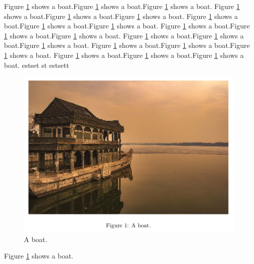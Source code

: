 \documentclass{article}
\begin{document}
Figure \ref{fig:boat1} shows a boat.Figure \ref{fig:boat1} shows a boat.Figure \ref{fig:boat1} shows a boat.
Figure \ref{fig:boat1} shows a boat.Figure \ref{fig:boat1} shows a boat.Figure \ref{fig:boat1} shows a boat.
Figure \ref{fig:boat1} shows a boat.Figure \ref{fig:boat1} shows a boat.Figure \ref{fig:boat1} shows a boat.
Figure \ref{fig:boat1} shows a boat.Figure \ref{fig:boat1} shows a boat.Figure \ref{fig:boat1} shows a boat.
Figure \ref{fig:boat1} shows a boat.Figure \ref{fig:boat1} shows a boat.Figure \ref{fig:boat1} shows a boat.
Figure \ref{fig:boat1} shows a boat.Figure \ref{fig:boat1} shows a boat.Figure \ref{fig:boat1} shows a boat.
Figure \ref{fig:boat1} shows a boat.Figure \ref{fig:boat1} shows a boat.Figure \ref{fig:boat1} shows a boat.
estset
st
estsett

\begin{figure}[h]
    \centering
    \includegraphics[width=0.4\linewidth]{boat.png}
    \caption{A boat.}
    \label{fig:boat1}
\end{figure}

Figure \ref{fig:boat1} shows a boat.
\end{document}
